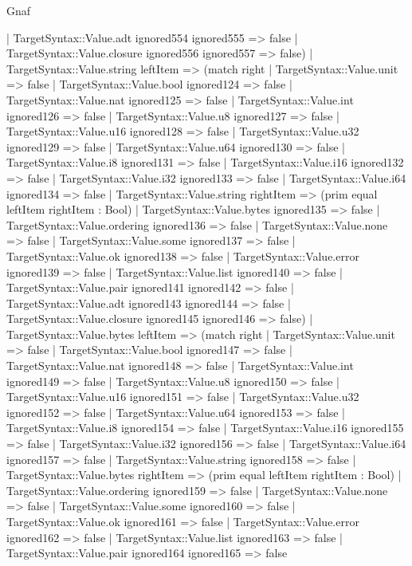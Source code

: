 \begin{lexlean}{Gnaf}
\begin{semanticmodule}
{      | TargetSyntax::Value.adt ignored554 ignored555 => false
      | TargetSyntax::Value.closure ignored556 ignored557 => false)
    | TargetSyntax::Value.string leftItem => (match right
      | TargetSyntax::Value.unit => false
      | TargetSyntax::Value.bool ignored124 => false
      | TargetSyntax::Value.nat ignored125 => false
      | TargetSyntax::Value.int ignored126 => false
      | TargetSyntax::Value.u8 ignored127 => false
      | TargetSyntax::Value.u16 ignored128 => false
      | TargetSyntax::Value.u32 ignored129 => false
      | TargetSyntax::Value.u64 ignored130 => false
      | TargetSyntax::Value.i8 ignored131 => false
      | TargetSyntax::Value.i16 ignored132 => false
      | TargetSyntax::Value.i32 ignored133 => false
      | TargetSyntax::Value.i64 ignored134 => false
      | TargetSyntax::Value.string rightItem => (prim equal leftItem rightItem : Bool)
      | TargetSyntax::Value.bytes ignored135 => false
      | TargetSyntax::Value.ordering ignored136 => false
      | TargetSyntax::Value.none => false
      | TargetSyntax::Value.some ignored137 => false
      | TargetSyntax::Value.ok ignored138 => false
      | TargetSyntax::Value.error ignored139 => false
      | TargetSyntax::Value.list ignored140 => false
      | TargetSyntax::Value.pair ignored141 ignored142 => false
      | TargetSyntax::Value.adt ignored143 ignored144 => false
      | TargetSyntax::Value.closure ignored145 ignored146 => false)
    | TargetSyntax::Value.bytes leftItem => (match right
      | TargetSyntax::Value.unit => false
      | TargetSyntax::Value.bool ignored147 => false
      | TargetSyntax::Value.nat ignored148 => false
      | TargetSyntax::Value.int ignored149 => false
      | TargetSyntax::Value.u8 ignored150 => false
      | TargetSyntax::Value.u16 ignored151 => false
      | TargetSyntax::Value.u32 ignored152 => false
      | TargetSyntax::Value.u64 ignored153 => false
      | TargetSyntax::Value.i8 ignored154 => false
      | TargetSyntax::Value.i16 ignored155 => false
      | TargetSyntax::Value.i32 ignored156 => false
      | TargetSyntax::Value.i64 ignored157 => false
      | TargetSyntax::Value.string ignored158 => false
      | TargetSyntax::Value.bytes rightItem => (prim equal leftItem rightItem : Bool)
      | TargetSyntax::Value.ordering ignored159 => false
      | TargetSyntax::Value.none => false
      | TargetSyntax::Value.some ignored160 => false
      | TargetSyntax::Value.ok ignored161 => false
      | TargetSyntax::Value.error ignored162 => false
      | TargetSyntax::Value.list ignored163 => false
      | TargetSyntax::Value.pair ignored164 ignored165 => false
}
\end{semanticmodule}
\end{lexlean}

